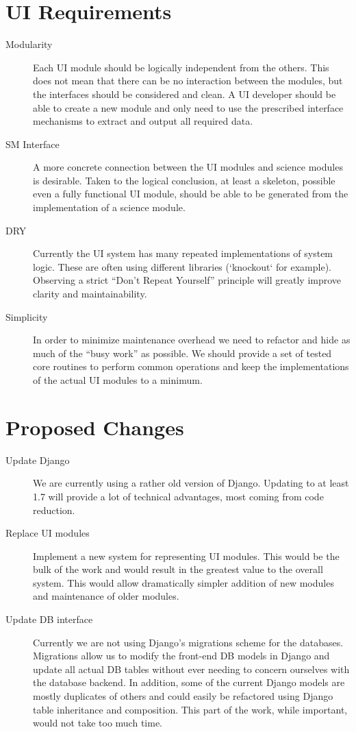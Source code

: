 \documentclass[12pt]{article}
\begin{document}
\section{UI Requirements}

\begin{description}
\item[Modularity] Each UI module should be logically independent from the others. This
  does not mean that there can be no interaction between the modules, but the interfaces
  should be considered and clean. A UI developer should be able to create a new module and
  only need to use the prescribed interface mechanisms to extract and output all required
  data.
\item[SM Interface] A more concrete connection between the UI modules and science modules
  is desirable. Taken to the logical conclusion, at least a skeleton, possible even a fully
  functional UI module, should be able to be generated from the implementation of a science
  module.
\item[DRY] Currently the UI system has many repeated implementations of system logic. These
  are often using different libraries (`knockout` for example). Observing a strict ``Don't
  Repeat Yourself'' principle will greatly improve clarity and maintainability.
\item[Simplicity] In order to minimize maintenance overhead we need to refactor and hide as
  much of the ``busy work'' as possible. We should provide a set of tested core routines to perform
  common operations and keep the implementations of the actual UI modules to a minimum.
\end{description}

\section{Proposed Changes}

\begin{description}
\item[Update Django] We are currently using a rather old version of Django. Updating to at least
  1.7 will provide a lot of technical advantages, most coming from code reduction.
\item[Replace UI modules] Implement a new system for representing UI modules. This would be the
  bulk of the work and would result in the greatest value to the overall system. This would allow
  dramatically simpler addition of new modules and maintenance of older modules.
\item[Update DB interface] Currently we are not using Django's migrations scheme for the databases.
  Migrations allow us to modify the front-end DB models in Django and update all actual DB tables
  without ever needing to concern ourselves with the database backend. In addition, some of
  the current Django models are mostly duplicates of others and could easily be refactored using
  Django table inheritance and composition. This part of the work, while important, would not take
  too much time.
\end{description}
\end{document}
